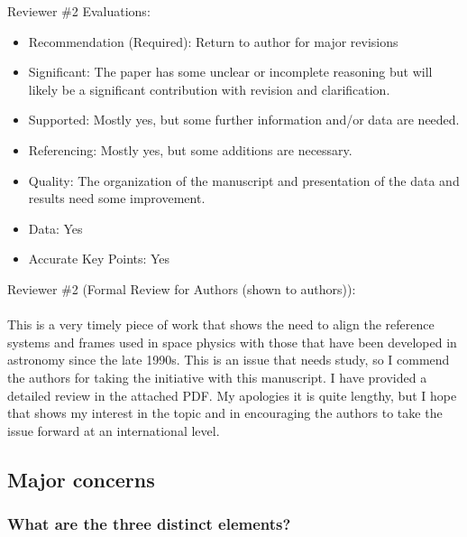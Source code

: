 \documentclass[11pt]{article}
\begin{document}
Reviewer \#2 Evaluations:
\begin{itemize}

\item[] Recommendation (Required): Return to author for major revisions
\item[] Significant: The paper has some unclear or incomplete reasoning but will likely be a significant contribution with revision and clarification.
\item[] Supported: Mostly yes, but some further information and/or data are needed.
\item[] Referencing: Mostly yes, but some additions are necessary.
\item[] Quality: The organization of the manuscript and presentation of the data and results need some improvement.
\item[] Data: Yes
\item[] Accurate Key Points: Yes
\end{itemize}


Reviewer \#2 (Formal Review for Authors (shown to authors)):
\\
\\
This is a very timely piece of work that shows the need to align the reference systems and frames used in space physics with those that have been developed in astronomy since the late 1990s. This is an issue that needs study, so I commend the authors for taking the initiative with this manuscript. I have provided a detailed review in the attached PDF. My apologies it is quite lengthy, but I hope that shows my interest in the topic and in encouraging the authors to take the issue forward at an international level.

\subsection{Major concerns}

\subsubsection{What are the three distinct elements?}
\end{document}
